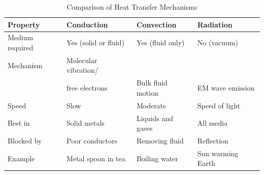 \begin{table}[H]
\centering
\caption{Comparison of Heat Transfer Mechanisms}
\label{tab:heat_transfer}
\begin{tabular}{llll}
\toprule
\textbf{Property} & \textbf{Conduction} &
\textbf{Convection} & \textbf{Radiation}\\
\midrule
Medium required & Yes (solid or fluid) &
  Yes (fluid only) & No (vacuum)\\
Mechanism & Molecular vibration/\\
  & free electrons &
  Bulk fluid motion &
  EM wave emission\\
Speed & Slow & Moderate & Speed of light\\
Best in & Solid metals &
  Liquids and gases & All media\\
Blocked by & Poor conductors &
  Removing fluid & Reflection\\
Example & Metal spoon in tea &
  Boiling water &
  Sun warming Earth\\
\bottomrule
\end{tabular}
\end{table}

